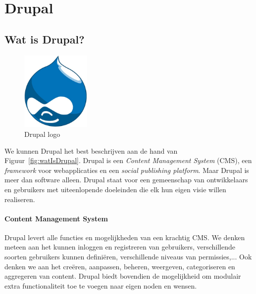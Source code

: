 \chapter{Drupal} \label{Drupal}

\section{Wat is Drupal?}

\begin{figure}
\vspace{-40pt}
\centering
\label{fig:drupalLogo}
\includegraphics[width=0.3\textwidth]{fig/drupalLogo}
\vspace{-30pt}
\centering
\caption{Drupal logo}
\centering
\vspace{-40pt}
\end{figure}
We kunnen Drupal het best beschrijven aan de hand van Figuur~\ref{fig:watIsDrupal}.
Drupal is een \textit{Content Management System} (CMS), een \textit{framework} voor webapplicaties en een \textit{social publishing platform}. Maar Drupal is meer dan software alleen. Drupal staat voor een gemeenschap van ontwikkelaars en gebruikers met uiteenlopende doeleinden die elk hun eigen visie willen realiseren.~\cite{drupalDefGuide}

\subsubsection{Content Management System}

Drupal levert alle functies en mogelijkheden van een krachtig CMS. We denken meteen aan het kunnen inloggen en registreren van gebruikers, verschillende soorten gebruikers kunnen defini\"{e}ren, verschillende niveaus van permissies,... Ook denken we aan het cre\"{e}ren, aanpassen, beheren, weergeven, categoriseren en aggregeren van content. Drupal biedt bovendien de mogelijkheid om modulair extra functionaliteit toe te voegen naar eigen noden en wensen.


